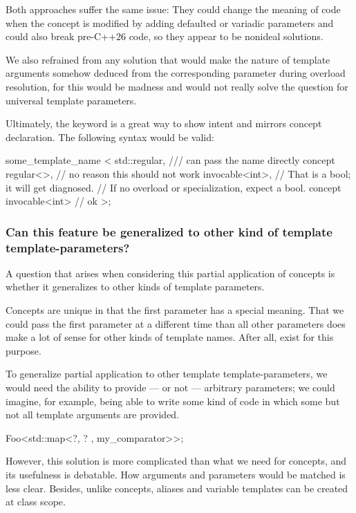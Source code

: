 \documentclass{wg21}
\begin{document}
Both approaches suffer the same issue: They could change the meaning of code when the concept is modified by adding defaulted or variadic
parameters and could also break pre-C++26 code, so they appear to be nonideal solutions.

We also refrained from any solution that would make the nature of template arguments somehow deduced from the corresponding parameter during overload resolution, for this would be madness and would not really solve the question for universal template parameters.

Ultimately, the  keyword is a great way to show intent and mirrors concept declaration. The following syntax would be valid:

\begin{colorblock}
some_template_name <
    std::regular,  /// can pass the name directly
    concept regular<>, // no reason this should not work
    invocable<int>, // That is a bool; it will get diagnosed.
                    // If no overload or specialization, expect a bool.
    concept invocable<int> // ok
>;
\end{colorblock}

\subsubsection{Can this feature be generalized to other kind of template template-parameters?}

A question that arises when considering this partial application of concepts is whether it generalizes to other kinds of template parameters.

Concepts are unique in that the first parameter has a special meaning. That we could pass the first parameter at a different time than all other parameters does make a lot of sense for other kinds of template names.
After all,  exist for this purpose.

To generalize partial application
to other template template-parameters, we would need the ability to provide --- or not --- arbitrary parameters;
we could imagine, for example, being able to write some kind of code in which some but not all template arguments are provided.

\begin{colorblock}
Foo<std::map<?, ? , my_comparator>>;
\end{colorblock}

However, this solution is more complicated than what we need for concepts, and its usefulness is debatable.
How arguments and parameters would be matched is less clear.
Besides, unlike concepts, aliases and variable templates can be created at class scope.
\end{document}
